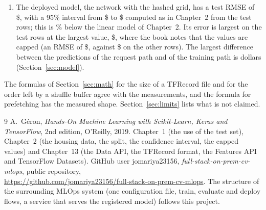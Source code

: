 \documentclass[11pt,a4paper]{article}
\begin{document}
\begin{enumerate}
\item The deployed model, the network with the hashed grid, has a test RMSE of \$, with a 95\% interval from \$ to \$ computed as in Chapter~2 from the  test rows; this is \% below the linear model of Chapter~2. Its error is largest on the  test rows at the largest value, \$, where the book notes that the values are capped (an RMSE of \$, against \$ on the other rows). The largest difference between the predictions of the request path and of the training path is  dollars (Section~\ref{sec:model}).
\end{enumerate}

The formulas of Section~\ref{sec:math} for the size of a TFRecord file and for the order left by a shuffle buffer agree with the measurements, and the formula for prefetching has the measured shape. Section~\ref{sec:limits} lists what is not claimed.

\newpage
\begingroup
\setlength{\parskip}{0pt}
\tableofcontents
\endgroup
\newpage












\begin{thebibliography}{9}
 A.~Géron, \emph{Hands-On Machine Learning with Scikit-Learn, Keras and TensorFlow},
2nd edition, O'Reilly, 2019. Chapter~1 (the use of the test set), Chapter~2 (the housing data,
the split, the confidence interval, the capped values) and
Chapter~13 (the Data API, the TFRecord format, the Features API and TensorFlow Datasets).
 GitHub user jomariya23156, \emph{full-stack-on-prem-cv-mlops}, public repository,\\
\url{https://github.com/jomariya23156/full-stack-on-prem-cv-mlops}. The structure of the surrounding
MLOps system (one configuration file, train, evaluate and deploy flows, a service that serves the
registered model) follows this project.
\end{thebibliography}
\end{document}
